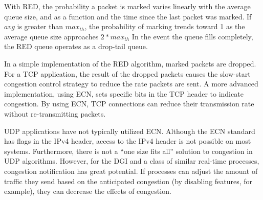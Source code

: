 With \ac{RED}, the probability a packet is marked varies linearly with the average queue size, and as a function and the time since the last packet was marked.
If $avg$ is greater than $max_{th}$, the probability of marking trends toward 1 as the average queue size approaches $2*max_{th}$
In the event the queue fills completely, the \ac{RED} queue operates as a drop-tail queue.

In a simple implementation of the \ac{RED} algorithm, marked packets are dropped.
For a TCP application, the result of the dropped packets causes the slow-start congestion control strategy to reduce the rate packets are sent.
A more advanced implementation, using \ac{ECN}, sets specific bits in the TCP header to indicate congestion.
By using \ac{ECN}, TCP connections can reduce their transmission rate without re-transmitting packets.

UDP applications have not typically utilized \ac{ECN}.
Although the \ac{ECN} standard has flags in the IPv4 header, access to the IPv4 header is not possible on most systems.
Furthermore, there is not a ``one size fits all'' solution to congestion in UDP algorithms.
However, for the \ac{DGI} and a class of similar real-time processes, congestion notification has great potential.
If processes can adjust the amount of traffic they send based on the anticipated congestion (by disabling features, for example), they can decrease the effects of congestion.

